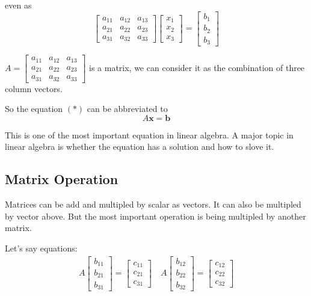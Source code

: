 \documentclass{article}
\newcommand{\vecs}[1]{\boldsymbol{#1}}
\begin{document}
    even as
    \begin{equation*}
        \begin{bmatrix}a_{11}&a_{12}&a_{13}\\a_{21}&a_{22}&a_{23}\\a_{31}&a_{32}&a_{33}\end{bmatrix}
        \begin{bmatrix}x_1\\x_2\\x_3\end{bmatrix}=
        \begin{bmatrix}b_1\\b_2\\b_3\end{bmatrix}
    \end{equation*}

    $A=\begin{bmatrix}a_{11}&a_{12}&a_{13}\\a_{21}&a_{22}&a_{23}\\a_{31}&a_{32}&a_{33}\end{bmatrix}$ is a matrix, we can consider it as the combination of three column vectors.

    So the equation $(*)$ can be abbreviated to
    $$A\vecs{x}=\vecs{b}$$

    This is one of the most important equation in linear algebra. A major topic in linear algebra is whether the equation has a solution and how to slove it.

    \subsection{Matrix Operation}

    Matrices can be add and multipled by scalar as vectors. It can also be multipled by vector above. But the most important operation is being multipled by another matrix.

    Let's say equations:
    \begin{gather*}
        A\begin{bmatrix}
            b_{11}\\b_{21}\\b_{31}
        \end{bmatrix}=
        \begin{bmatrix}
            c_{11}\\c_{21}\\c_{31}
        \end{bmatrix}\quad
        A\begin{bmatrix}
            b_{12}\\b_{22}\\b_{32}
        \end{bmatrix}=
        \begin{bmatrix}
            c_{12}\\c_{22}\\c_{32}
        \end{bmatrix}
    \end{gather*}
\end{document}
